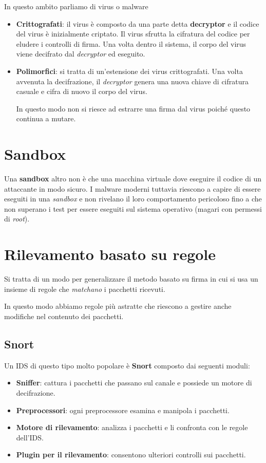 In questo ambito parliamo di virus o malware
\begin{itemize}
	\item \textbf{Crittografati}: il virus è composto da una parte detta \textbf{decryptor} e il codice del virus è
	      inizialmente criptato. Il virus sfrutta la cifratura del codice per eludere i controlli di firma. Una volta
	      dentro il sistema, il corpo del virus viene decifrato dal \emph{decryptor} ed eseguito.
	\item \textbf{Polimorfici}: si tratta di un'estensione dei virus crittografati. Una volta avvenuta la decifrazione,
	      il \emph{decryptor} genera una nuova chiave di cifratura casuale e cifra di nuovo il corpo del virus.

	      In questo modo non si riesce ad estrarre una firma dal virus poiché questo continua a mutare.
\end{itemize}

\section{Sandbox}
Una \textbf{sandbox} altro non è che una macchina virtuale dove eseguire il codice di un attaccante in modo sicuro. I
malware moderni tuttavia riescono a capire di essere eseguiti in una \emph{sandbox} e non rivelano il loro
comportamento pericoloso fino a che non superano i test per essere eseguiti sul sistema operativo (magari con permessi
di \emph{root}).

\section{Rilevamento basato su regole}
Si tratta di un modo per generalizzare il metodo basato su firma in cui si usa un insieme di regole che \emph{matchano}
i pacchetti ricevuti.

In questo modo abbiamo regole più astratte che riescono a gestire anche modifiche nel contenuto dei pacchetti.

\subsection{Snort}
Un IDS di questo tipo molto popolare è \textbf{Snort} composto dai seguenti moduli:
\begin{itemize}
	\item \textbf{Sniffer}: cattura i pacchetti che passano sul canale e possiede un motore di decifrazione.
	\item \textbf{Preprocessori}: ogni preprocessore esamina e manipola i pacchetti.
	\item \textbf{Motore di rilevamento}: analizza i pacchetti e li confronta con le regole dell'IDS.
	\item \textbf{Plugin per il rilevamento}: consentono ulteriori controlli sui pacchetti.
\end{itemize}

